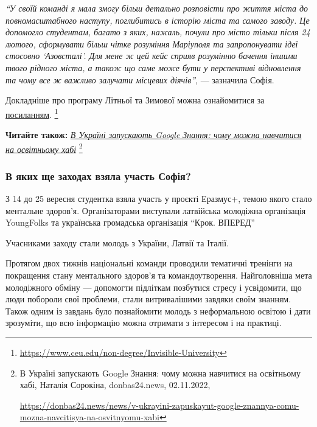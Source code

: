 \begin{leftbar}
\emph{\enquote{У своїй команді я мала змогу більш детально розповісти про життя міста до
повномасштабного наступу, поглибитись в історію міста та самого заводу. Це
допомогло студентам, багато з яких, нажаль, почули про місто тільки після 24
лютого, сформувати більш чітке розуміння Маріуполя та запропонувати ідеї
стосовно \enquote{Азовсталі}. Для мене ж цей кейс сприяв розумінню бачення іншими твого
рідного міста, а також що саме може бути у перспективі відновлення та чому все
ж важливо залучати місцевих діячів}}, — зазначила Софія.
\end{leftbar}

Докладніше про програму Літньої та Зимової можна ознайомитися за \href{https://www.ceu.edu/non-degree/Invisible-University}{посиланням}.%
\footnote{\url{https://www.ceu.edu/non-degree/Invisible-University}}


\textbf{Читайте також:} \href{https://donbas24.news/news/v-ukrayini-zapuskayut-google-znannya-comu-mozna-navcitisya-na-osvitnyomu-xabi}{\emph{В Україні запускають Google Знання: чому можна навчитися на освітньому хабі}}%
\footnote{В Україні запускають Google Знання: чому можна навчитися на освітньому хабі, Наталія Сорокіна, donbas24.news, 02.11.2022, \par%
\url{https://donbas24.news/news/v-ukrayini-zapuskayut-google-znannya-comu-mozna-navcitisya-na-osvitnyomu-xabi}%
}

\subsubsection{В яких ще заходах взяла участь Софія?}

З 14 до 25 вересня студентка взяла участь у проєкті Еразмус+, темою якого стало
ментальне здоров'я. Організаторами виступали латвійська молодіжна організація
YoungFolks та українська громадська організація \enquote{Крок. ВПЕРЕД}

Учасниками заходу стали молодь з України, Латвії та Італії.

Протягом двох тижнів національні команди проводили тематичні тренінги на
покращення стану ментального здоров'я та командоутворення. Найголовніша мета
молодіжного обміну — допомогти підліткам позбутися стресу і усвідомити, що люди
побороли свої проблеми, стали витривалішими завдяки своїм знанням. Також одним
із завдань було познайомити молодь з неформальною освітою і дати зрозуміти, що
всю інформацію можна отримати з інтересом і на практиці.

